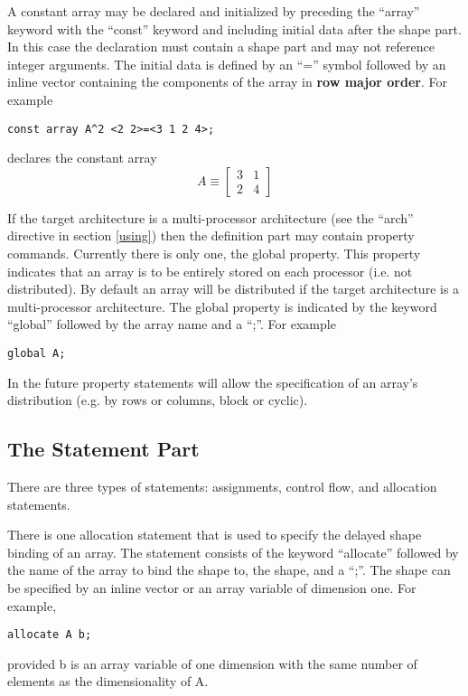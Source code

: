 A constant array may be declared and initialized by preceding the ``array''
keyword with the ``const'' keyword and including initial data after the
shape part.  In this case the declaration must contain a shape part and
may not reference integer arguments.  The initial data is defined by
an ``='' symbol followed by an inline vector containing the components
of the array in {\bf row major order}.  For example
\begin{verbatim}
const array A^2 <2 2>=<3 1 2 4>;
\end{verbatim}
declares the constant array
$$A\equiv\left[ \begin{array}{ll}
3 & 1 \\
2 & 4
\end{array} \right]$$

If the target architecture is a multi-processor architecture (see the ``arch''
directive in section \ref{using}) then the definition part may contain property
commands.  Currently there is only one, the global property.  This property
indicates that an array is to be entirely stored on each processor (i.e. not
distributed).  By default an array will be distributed if the target 
architecture is a multi-processor architecture.  The global property is
indicated by the keyword ``global'' followed by the array name and a ``;''.
For example
\begin{verbatim}
global A;
\end{verbatim}
In the future property
statements will allow the specification of an array's distribution (e.g. by
rows or columns, block or cyclic).

\subsection{The Statement Part}
\label{statement_sec}
There are three types of statements: assignments, control flow, and allocation
statements.

There is one allocation statement that is used to specify the delayed shape 
binding of an array.  The statement consists of the keyword ``allocate''
followed by the name of the array to bind the shape to, the shape, and
a ``;''.  The shape can be specified by an inline vector or an array variable
of dimension one.  For example,
\begin{verbatim}
allocate A b;
\end{verbatim}
provided b is an array variable of one dimension with the same number of
elements as the dimensionality of A.

